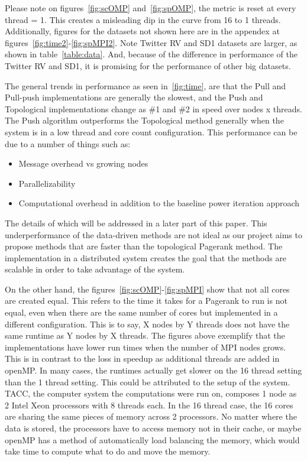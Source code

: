 \documentclass[letterpaper,11pt,onecolumn]{article}
\begin{document}
Please note on figures~\ref{fig:scOMP} and~\ref{fig:spOMP}, the metric is reset at every thread = 1. This creates a misleading dip in the curve from 16 to 1 threads. Additionally, figures for the datasets not shown here are in the appendex at figures~\ref{fig:time2}-\ref{fig:spMPI2}. Note Twitter RV and SD1 datasets are larger, as shown in table~\ref{table:data}. And, because of the difference in performance of the Twitter RV and SD1, it is promising for the performance of other big datasets. 

The general trends in performance as seen in~\ref{fig:time}, are that the Pull and Pull-push implementations are generally the slowest, and the Push and Topological implementations change as \#1 and \#2 in speed over nodes x threads. The Push algorithm outperforms the Topological method generally when the system is in a low thread and core count configuration. This performance can be due to a number of things such as:

\begin{itemize}
\item Message overhead vs growing nodes
\item Parallelizability
\item Computational overhead in addition to the baseline power iteration approach
\end{itemize}

The details of which will be addressed in a later part of this paper. This underperformance of the data-driven methods are not ideal as our project aims to propose methods that are faster than the topological Pagerank method. The implementation in a distributed system creates the goal that the methods are scalable in order to take advantage of the system.

On the other hand, the figures~\ref{fig:scOMP}-\ref{fig:spMPI} show that not all cores are created equal. This refers to the time it takes for a Pagerank to run is not equal, even when there are the same number of cores but implemented in a different configuration. This is to say, X nodes by Y threads does not have the same runtime as Y nodes by X threads. The figures above exemplify that the implementations have lower run times when the number of MPI nodes grows. This is in contrast to the loss in speedup as additional threads are added in openMP. In many cases, the runtimes actually get slower on the 16 thread setting than the 1 thread setting. This could be attributed to the setup of the system. TACC, the computer system the computations were run on, composes 1 node as 2 Intel Xeon processors with 8 threads each. In the 16 thread case, the 16 cores are sharing the same pieces of memory across 2 processors. No matter where the data is stored, the processors have to access memory not in their cache, or maybe openMP has a method of automatically load balancing the memory, which would take time to compute what to do and move the memory. 
\end{document}

